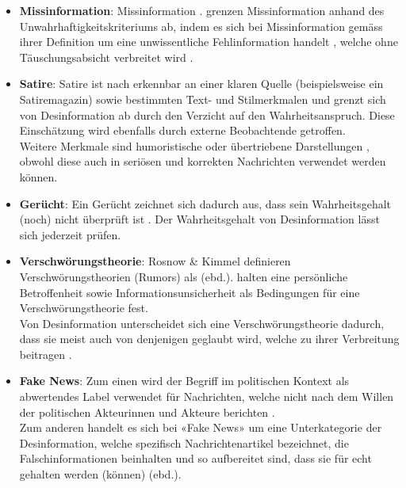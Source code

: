 \documentclass[12pt,a4paper]{article}        %
\begin{document}
\begin{itemize}
  \item \textbf{Missinformation}: Missinformation  \parencite[2]{bontridder_role_2021}. \citeauthor{marx_fake_2020} grenzen Missinformation anhand des Unwahrhaftigkeitskriteriums ab, indem es sich bei Missinformation gemäss ihrer Definition um eine unwissentliche Fehlinformation handelt \parencite[156]{marx_fake_2020}, welche ohne Täuschungsabsicht verbreitet wird \parencite[vgl.\ auch][15]{grujic_warnhinweise_2024}.
  \item \textbf{Satire}: Satire ist nach \textcite[154]{marx_fake_2020} erkennbar an einer klaren Quelle (beispielsweise ein Satiremagazin) sowie bestimmten Text- und Stilmerkmalen und grenzt sich von Desinformation ab durch den Verzicht auf den Wahrheitsanspruch. Diese Einschätzung wird ebenfalls durch externe Beobachtende getroffen.\\
    Weitere Merkmale sind humoristische oder übertriebene Darstellungen \parencites[141]{tandoc_jr_defining_2018}[2]{khan_fake_2021}, obwohl diese auch in seriösen und korrekten Nachrichten verwendet werden können.
  \item \textbf{Gerücht}: Ein Gerücht zeichnet sich dadurch aus, dass sein Wahrheitsgehalt (noch) nicht überprüft ist \parencite[155]{marx_fake_2020}. Der Wahrheitsgehalt von Desinformation lässt sich jederzeit prüfen.
  \item \textbf{Verschwörungstheorie}: Rosnow \& Kimmel \parencite[zit.\ nach][197]{krafft_disinformation_2020} definieren Verschwörungstheorien (Rumors) als  (ebd.). \textcite[197]{krafft_disinformation_2020} halten eine persönliche Betroffenheit sowie Informationsunsicherheit als Bedingungen für eine Verschwörungstheorie fest.\\
    Von Desinformation unterscheidet sich eine Verschwörungstheorie dadurch, dass sie meist auch von denjenigen geglaubt wird, welche zu ihrer Verbreitung beitragen \parencite[156]{marx_fake_2020}.
  \item \textbf{Fake News}: Zum einen wird der Begriff im politischen Kontext als abwertendes Label verwendet für Nachrichten, welche nicht nach dem Willen der politischen Akteurinnen und Akteure berichten \parencite[3]{tandoc_jr_facts_2019}.\\
    Zum anderen handelt es sich bei «Fake News» um eine Unterkategorie der Desinformation, welche spezifisch Nachrichtenartikel bezeichnet, die Falschinformationen beinhalten und so aufbereitet sind, dass sie für echt gehalten werden (können) (ebd.).
\end{itemize}
\end{document}

